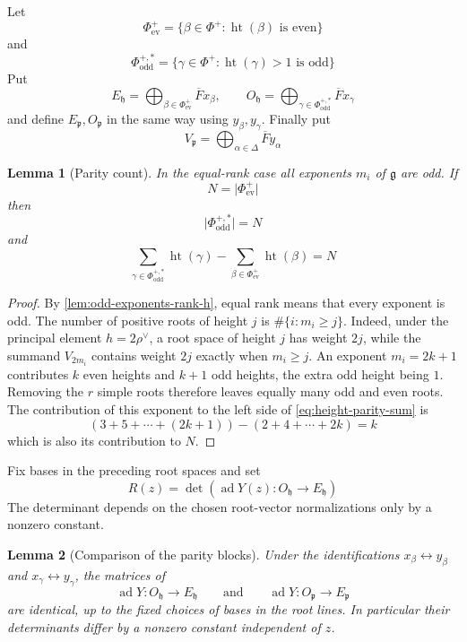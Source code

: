 \documentclass[11pt]{amsart}
\newtheorem{lemma}[lemma]{Lemma}
\theoremstyle{definition}
\theoremstyle{remark}
\newcommand{\Fb}{\overline F}
\newcommand{\ad}{\operatorname{ad}}
\newcommand{\abs}[1]{\lvert #1\rvert}
\newcommand{\g}{\mathfrak g}
\newcommand{\h}{\mathfrak h}
\newcommand{\p}{\mathfrak p}
\begin{document}
Let
\[
 \Phi_{\mathrm{ev}}^+
 =\{\beta\in\Phi^+:\operatorname{ht}(\beta)\text{ is even}\}
\]
and
\[
 \Phi_{\mathrm{odd}}^{+,*}
 =\{\gamma\in\Phi^+:\operatorname{ht}(\gamma)>1
       \text{ is odd}\}
\]
Put
\[
 E_\h=\bigoplus_{\beta\in\Phi_{\mathrm{ev}}^+}\Fb x_\beta,
 \qquad
 O_\h=\bigoplus_{\gamma\in\Phi_{\mathrm{odd}}^{+,*}}\Fb x_\gamma
\]
and define $E_\p,O_\p$ in the same way using $y_\beta,y_\gamma$.  Finally put
\[
 V_\p=\bigoplus_{\alpha\in\Delta}\Fb y_\alpha
\]

\begin{lemma}[Parity count]\label{lem:height-parity-count}
In the equal-rank case all exponents $m_i$ of $\g$ are odd.  If
\[
 N=\abs{\Phi_{\mathrm{ev}}^+}
\]
then
\[
 \abs{\Phi_{\mathrm{odd}}^{+,*}}=N
\]
and
\begin{equation}\label{eq:height-parity-sum}
 \sum_{\gamma\in\Phi_{\mathrm{odd}}^{+,*}}
       \operatorname{ht}(\gamma)
 -\sum_{\beta\in\Phi_{\mathrm{ev}}^+}
       \operatorname{ht}(\beta)
 =N
\end{equation}
\end{lemma}

\begin{proof}
By \cref{lem:odd-exponents-rank-h}, equal rank means that every exponent is
odd.  The number of positive roots of height $j$ is
$\#\{i:m_i\geq j\}$.  Indeed, under the principal element
$h=2\rho^\vee$, a root space of height $j$ has weight $2j$, while the
summand $V_{2m_i}$ contains weight $2j$ exactly when $m_i\geq j$.  An exponent $m_i=2k+1$ contributes $k$ even heights and
$k+1$ odd heights, the extra odd height being $1$.  Removing the $r$ simple
roots therefore leaves equally many odd and even roots.  The contribution of
this exponent to the left side of \eqref{eq:height-parity-sum} is
\[
 (3+5+\cdots+(2k+1))-(2+4+\cdots+2k)=k
\]
which is also its contribution to $N$.
\end{proof}

Fix bases in the preceding root spaces and set
\begin{equation}\label{eq:parity-minor}
 R(z)=\det\left(
 \ad Y(z):O_\h\longrightarrow E_\h
 \right)
\end{equation}
The determinant depends on the chosen root-vector normalizations only by a
nonzero constant.

\begin{lemma}[Comparison of the parity blocks]\label{lem:parity-block-comparison}
Under the identifications $x_\beta\leftrightarrow y_\beta$ and
$x_\gamma\leftrightarrow y_\gamma$, the matrices of
\[
 \ad Y:O_\h\longrightarrow E_\h
 \qquad\text{and}\qquad
 \ad Y:O_\p\longrightarrow E_\p
\]
are identical, up to the fixed choices of bases in the root lines.  In
particular their determinants differ by a nonzero constant independent of
$z$.
\end{lemma}
\end{document}
